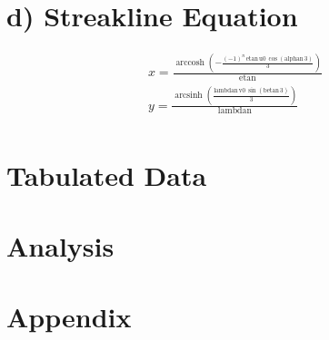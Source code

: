 \documentclass[12pt,letterpaper,notitlepage]{article}
\begin{document}
\section{d) Streakline Equation}
\begin{eqnarray}
x = \frac{\mathop{\mathrm{arccosh}}\nolimits\!\left(-\frac{{\left(- 1\right)}^n\, \mathrm{etan}\, \mathrm{u0}\, \cos\!\left(\mathrm{alphan}\, 3\right)}{3}\right)}{\mathrm{etan}}\\
y = \frac{\mathop{\mathrm{arcsinh}}\nolimits\!\left(\frac{\mathrm{lambdan}\, \mathrm{v0}\, \sin\!\left(\mathrm{betan}\, 3\right)}{3}\right)}{\mathrm{lambdan}}\\
\end{eqnarray}
\section{Tabulated Data}
\section{Analysis}
\section{Appendix}
\end{document}
